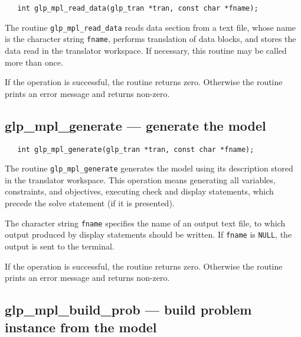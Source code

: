 \synopsis

\begin{verbatim}
   int glp_mpl_read_data(glp_tran *tran, const char *fname);
\end{verbatim}

\description

The routine \verb|glp_mpl_read_data| reads data section from a text
file, whose name is the character string \verb|fname|, performs
translation of data blocks, and stores the data read in the translator
workspace. If necessary, this routine may be called more than once.

\returns

If the operation is successful, the routine returns zero. Otherwise
the routine prints an error message and returns non-zero.

\subsection{glp\_mpl\_generate --- generate the model}

\synopsis

\begin{verbatim}
   int glp_mpl_generate(glp_tran *tran, const char *fname);
\end{verbatim}

\description

The routine \verb|glp_mpl_generate| generates the model using its
description stored in the translator workspace. This operation means
generating all variables, constraints, and objectives, executing check
and display statements, which precede the solve statement (if it is
presented).

The character string \verb|fname| specifies the name of an output text
file, to which output produced by display statements should be written.
If \verb|fname| is \verb|NULL|, the output is sent to the terminal.

\returns

If the operation is successful, the routine returns zero. Otherwise
the routine prints an error message and returns non-zero.

\vspace*{-6pt}

\subsection{glp\_mpl\_build\_prob --- build problem instance from the
model}

\synopsis


